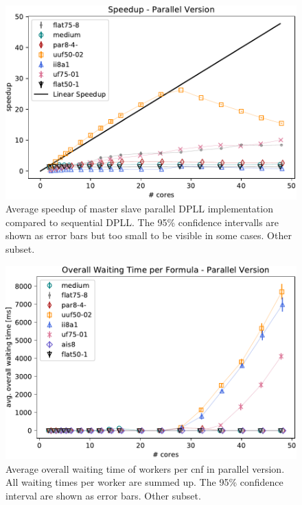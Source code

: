 \documentclass[letterpaper]{article}
\begin{document}
\begin{figure}[h]
    \centering
    \includegraphics[width=\columnwidth]{figures/scaling_parallel_non_subset_dpll_scaling_tar.pdf}
    \caption{Average speedup of master slave parallel DPLL implementation compared to sequential DPLL.
    The 95\% confidence intervalls are shown as error bars but too small to be visible in some cases.
    Other subset.}
    \label{fig:dpll_parallel_speedup_non}
\end{figure}

\begin{figure}[h]
    \centering
    \includegraphics[width=\columnwidth]{figures/waiting_parallel_non_subset_dpll_scaling_tar.pdf}
    \caption{Average overall waiting time of workers per cnf in parallel version.
    All waiting times per worker are summed up.
    The 95\% confidence interval are shown as error bars.
    Other subset.}
    \label{fig:dpll_parallel_waiting_non}
\end{figure}
\end{document}
